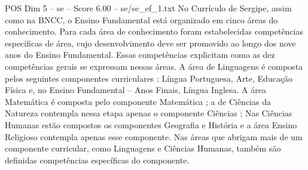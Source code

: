 \begin{textsample}{POS Dim 5 – se – Score 6.00 – se/se\_ef\_1.txt}
No Currículo de Sergipe, assim como na BNCC, o Ensino Fundamental está organizado em cinco áreas do conhecimento.
Para cada área de conhecimento foram estabelecidas competências específicas de área, cujo desenvolvimento deve ser promovido ao longo dos nove anos do Ensino Fundamental.
Essas competências explicitam como as dez competências gerais se expressam nessas áreas.
A área de Linguagens é composta pelos seguintes componentes curriculares : Língua Portuguesa, Arte, Educação Física e, no Ensino Fundamental – Anos Finais, Língua Inglesa.
A área Matemática é composta pelo componente Matemática ; a de Ciências da Natureza contempla nessa etapa apenas o componente Ciências ; Nas Ciências Humanas estão compostos os componentes Geografia e História e a área Ensino Religioso contempla apenas esse componente.
Nas áreas que abrigam mais de um componente curricular, como Linguagens e Ciências Humanas, também são definidas competências específicas do componente.

\end{textsample}
